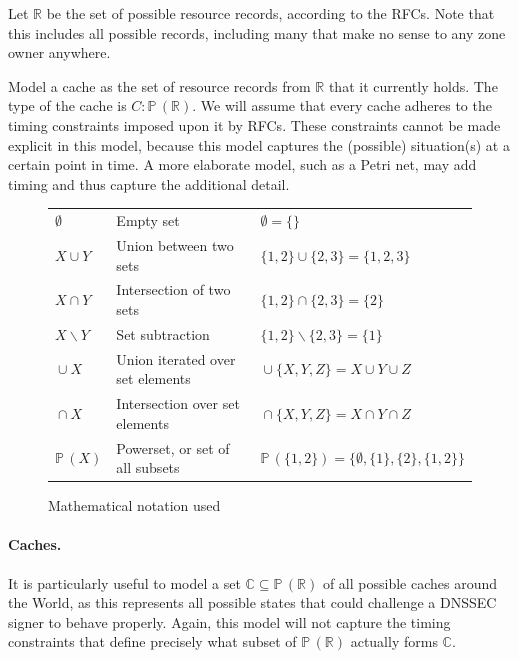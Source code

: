 \documentclass[twoside,english]{article}
\newcommand{\union}{\mathrel{\cup}}
\newcommand{\intersection}{\mathrel{\cap}}
\renewcommand{\setminus}{\mathrel{\backslash}}
\newcommand{\powerset}{\mathopen{\mathbb{P}}\ensuremath{\,}}
\begin{document}
Let $\mathbb{R}$ be the set of possible resource records, according to the
RFCs.  Note that this includes all possible records, including many
that make no sense to any zone owner anywhere.


Model a cache as the set of resource records from $\mathbb{R}$ that it currently
holds.  The type of the cache is $C:\powerset(\mathbb{R})$.  We will assume
that every cache adheres to the timing constraints imposed upon it by RFCs.
These constraints cannot be made explicit in this model, because this model
captures the (possible) situation(s) at a certain point in time.  A more
elaborate model, such as a Petri net, may add timing and thus capture the
additional detail.

\begin{figure}[t]
	\begin{tabular}{lll}
	$\emptyset$ & Empty set & $\emptyset = \{ \}$ \\
	$X\cup Y$ & Union between two sets & $\{1,2\} \cup \{2,3\} = \{1,2,3\}$ \\
	$X\cap Y$ & Intersection of two sets & $\{1,2\} \cap \{2,3\} = \{2\}$ \\
	$X\setminus Y$ & Set subtraction & $\{1,2\}\setminus \{2,3\} = \{1\}$ \\
	$\union X$ & Union iterated over set elements & $\union\{X,Y,Z\} = X\cup Y\cup Z$ \\
	$\intersection X$ & Intersection over set elements & $\intersection\{X,Y,Z\} = X\cap Y\cap Z$ \\
	$\powerset(X)$ & Powerset, or set of all subsets & $\powerset(\{1,2\}) = \{ \emptyset, \{1\}, \{2\}, \{1,2\}\}$ \\
	\end{tabular}
	\caption{Mathematical notation used}
\end{figure}

\paragraph{Caches.}
It is particularly useful to model a set $\mathbb{C}\subseteq\powerset(\mathbb{R})$ of all
possible caches around the World, as this represents all possible states
that could challenge a DNSSEC signer to behave properly.  Again, this
model will not capture the timing constraints that define precisely what
subset of $\powerset(\mathbb{R})$ actually forms $\mathbb{C}$.

\end{document}
